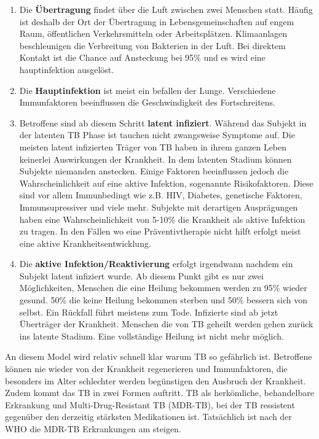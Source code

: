 \documentclass[paper=a4, fontsize=11pt, ngerman, abstract=on]{scrartcl}
\numberwithin{equation}{section} %
\numberwithin{figure}{section} %
\numberwithin{table}{section} %
\begin{document}
\begin{enumerate}
  \item{Die \textbf{Übertragung} findet über die Luft zwischen zwei Menschen statt. Häufig ist deshalb der Ort der Übertragung in Lebensgemeinschaften auf engem Raum, öffentlichen Verkehrsmitteln oder Arbeitsplätzen. Klimaanlagen beschleunigen die Verbreitung von Bakterien in der Luft. Bei direktem Kontakt ist die Chance auf Ansteckung bei 95\% und es wird eine hauptinfektion ausgelöst.}
  \item{Die \textbf{Hauptinfektion} ist meist ein befallen der Lunge. Verschiedene Immunfaktoren beeinflussen die Geschwindigkeit des Fortschreitens.}
  \item{Betroffene sind ab diesem Schritt \textbf{latent infiziert}. Während das Subjekt in der latenten TB Phase ist tauchen nicht zwangsweise Symptome auf. Die meisten latent infizierten Träger von TB haben in ihrem ganzen Leben keinerlei Auswirkungen der Krankheit. In dem latenten Stadium können Subjekte niemanden anstecken. Einige Faktoren beeinflussen jedoch die Wahrscheinlichkeit auf eine aktive Infektion, sogenannte Risikofaktoren. Diese sind vor allem Immunbedingt wie z.B. HIV, Diabetes, genetische Faktoren, Immunsupressiver und viele mehr. Subjekte mit derartigen Ausprägungen haben eine Wahrscheinlichkeit von 5-10\% die Krankheit als aktive Infektion zu tragen. In den Fällen wo eine Präventivtherapie nicht hilft erfolgt meist eine aktive Krankheitsentwicklung.}
  \item{Die \textbf{aktive Infektion/Reaktivierung} erfolgt irgendwann nachdem ein Subjekt latent infiziert wurde. Ab diesem Punkt gibt es nur zwei Möglichkeiten, Menschen die eine Heilung bekommen werden zu 95\% wieder gesund. 50\% die keine Heilung bekommen sterben und 50\% bessern sich von selbst. Ein Rückfall führt meistens zum Tode. Infizierte sind ab jetzt Überträger der Krankheit. Menschen die von TB geheilt werden gehen zurück ins latente Stadium. Eine vollständige Heilung ist nicht mehr möglich.}
\end{enumerate}

An diesem Model wird relativ schnell klar warum TB so gefährlich ist. Betroffene können nie wieder von der Krankheit regenerieren und Immunfaktoren, die besonders im Alter schlechter werden begünstigen den Ausbruch der Krankheit. Zudem kommt das TB in zwei Formen auftritt. TB als herkömliche, behandelbare Erkrankung und Multi-Drug-Resistant TB (MDR-TB), bei der TB ressistent gegenüber den derzeitig stärksten Medikationen ist. Tatsächlich ist nach der WHO die MDR-TB Erkrankungen am steigen.
\end{document}
